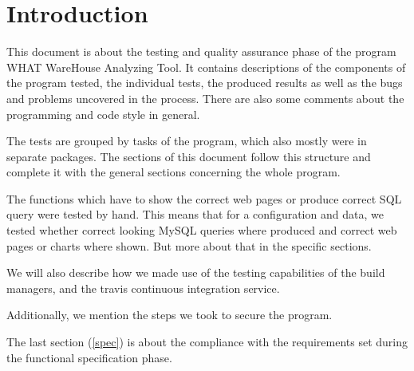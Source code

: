 \section{Introduction}

This document is about the testing and quality assurance phase of the program WHAT WareHouse Analyzing Tool.
It contains descriptions of the components of the program tested, the individual tests,
the produced results as well as the bugs and problems uncovered in the process. 
There are also some comments about the programming and code style in general. 

The tests are grouped by tasks of the program, which also mostly were in separate packages. 
The sections of this document follow this structure and complete it with the 
general sections concerning the whole program. %

The functions which have to show the correct web pages or produce correct SQL query were tested by hand. 
This means that for a configuration and data, we tested 
whether correct looking MySQL queries where produced and correct web pages or charts where shown. 
But more about that in the specific sections.

We will also describe how we made use of the testing capabilities of the build managers, 
and the travis continuous integration service.

Additionally, we mention the steps we took to secure the program.


The last section (\ref{spec}) is about the compliance with the requirements set during the functional specification
phase.

 
